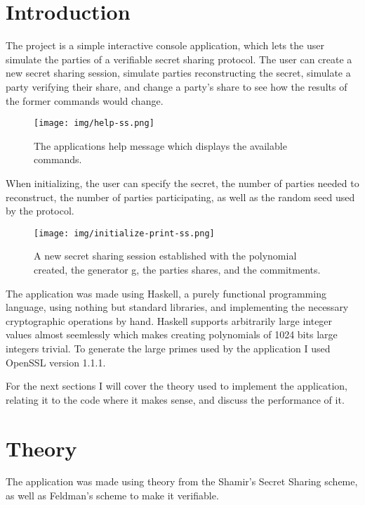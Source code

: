 \documentclass[a4paper,oneside,12pt,final]{article}
\begin{document}
 


\newpage

\section{Introduction} 

The project is a simple interactive console application, which lets the user
simulate the parties of a verifiable secret sharing protocol. The user can
create a new secret sharing session, simulate parties reconstructing the secret,
simulate a party verifying their share, and change a party's share to see how
the results of the former commands would change.

\begin{figure}[h]
\label{fig:help}
\center
\texttt{[image: img/help-ss.png]}
\caption{The applications help message which displays the available commands.}
\end{figure}

When initializing, the user can specify the secret, the number of parties needed
to reconstruct, the number of parties participating, as well as the random seed
used by the protocol.

\begin{figure}[h]
\label{fig:initialize-secret-sharing}
\center
\texttt{[image: img/initialize-print-ss.png]}
\caption{A new secret sharing session established with the polynomial created, 
         the generator g, the parties shares, and the commitments.}
\end{figure}

The application was made using Haskell, a purely functional programming
language, using nothing but standard libraries, and implementing the necessary
cryptographic operations by hand. Haskell supports arbitrarily large integer
values almost seemlessly which makes creating polynomials of 1024 bits large
integers trivial. To generate the large primes used by the application I used
OpenSSL version 1.1.1.

For the next sections I will cover the theory used to implement the application,
relating it to the code where it makes sense, and discuss the performance of it.

\section{Theory}

The application was made using theory from the Shamir's Secret Sharing
scheme, as well as Feldman's scheme to make it verifiable. 
\end{document}
